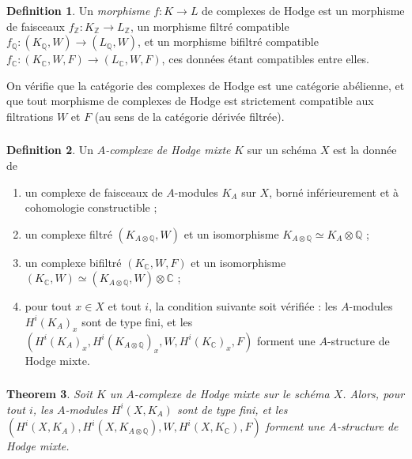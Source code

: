 \documentclass[11pt]{amsart}
\theoremstyle{plain}
\newtheorem{theorem}{Theorem}[section]
\theoremstyle{definition}
\newtheorem{definition}[theorem]{Definition}
\newcommand{\CC}{\mathbb{C}}
\newcommand{\QQ}{\mathbb{Q}}
\newcommand{\ZZ}{\mathbb{Z}}
\begin{document}
\subsubsection{}
\begin{definition}
Un \emph{morphisme} $f : K \to L$ de complexes de Hodge est un morphisme de faisceaux $f_\ZZ : K_\ZZ \to L_\ZZ$, un morphisme filtr\'e compatible $f_\QQ : (K_\QQ, W) \to (L_\QQ, W)$, et un morphisme bifiltr\'e compatible $f_\CC : (K_\CC, W, F) \to (L_\CC, W, F)$, ces donn\'ees \'etant compatibles entre elles.
\end{definition}

On v\'erifie que la cat\'egorie des complexes de Hodge est une cat\'egorie ab\'elienne, et que tout morphisme de complexes de Hodge est strictement compatible aux filtrations $W$ et $F$ (au sens de la cat\'egorie d\'eriv\'ee filtr\'ee).

\subsubsection{}
\begin{definition}
Un \emph{$A$-complexe de Hodge mixte} $K$ sur un sch\'ema $X$ est la donn\'ee de
\begin{enumerate}
\item[(i)] un complexe de faisceaux de $A$-modules $K_A$ sur $X$, born\'e inf\'erieurement et \`a cohomologie constructible ;
\item[(ii)] un complexe filtr\'e $(K_{A \otimes \QQ}, W)$ et un isomorphisme $K_{A \otimes \QQ} \simeq K_A \otimes \QQ$ ;
\item[(iii)] un complexe bifiltr\'e $(K_\CC, W, F)$ et un isomorphisme $(K_\CC, W) \simeq (K_{A \otimes \QQ}, W) \otimes \CC$ ;
\item[(iv)] pour tout $x \in X$ et tout $i$, la condition suivante soit v\'erifi\'ee :
les $A$-modules $H^i(K_A)_x$ sont de type fini, et les $(H^i(K_A)_x, H^i(K_{A \otimes \QQ})_x, W, H^i(K_\CC)_x, F)$ forment une $A$-structure de Hodge mixte.
\end{enumerate}
\end{definition}

\subsubsection{}
\begin{theorem}
Soit $K$ un $A$-complexe de Hodge mixte sur le sch\'ema $X$. Alors, pour tout $i$, les $A$-modules $H^i(X, K_A)$ sont de type fini, et les $(H^i(X, K_A), H^i(X, K_{A \otimes \QQ}), W, H^i(X, K_\CC), F)$ forment une $A$-structure de Hodge mixte.
\end{theorem}
\end{document}
